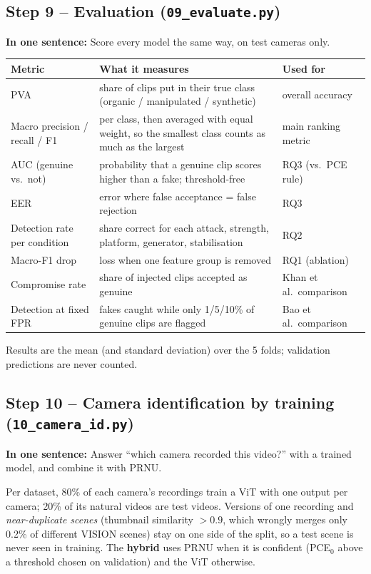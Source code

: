 \documentclass[11pt,a4paper]{article}
\newcommand{\say}[1]{\begin{onesentence}\small\textbf{In one sentence:} #1\end{onesentence}}
\begin{document}
\subsection{Step 9 -- Evaluation (\texttt{09\_evaluate.py})}
\say{Score every model the same way, on test cameras only.}
\begin{table}[H]\centering\small
\begin{tabularx}{\linewidth}{lYl}\toprule
Metric & What it measures & Used for \\\midrule
PVA & share of clips put in their true class (organic / manipulated / synthetic) & overall accuracy \\
Macro precision / recall / F1 & per class, then averaged with equal weight, so the smallest class counts as much as the largest & main ranking metric \\
AUC (genuine vs.\ not) & probability that a genuine clip scores higher than a fake; threshold-free & RQ3 (vs.\ PCE rule) \\
EER & error where false acceptance = false rejection & RQ3 \\
Detection rate per condition & share correct for each attack, strength, platform, generator, stabilisation & RQ2 \\
Macro-F1 drop & loss when one feature group is removed & RQ1 (ablation) \\
Compromise rate & share of injected clips accepted as genuine & Khan et al.\ comparison \\
Detection at fixed FPR & fakes caught while only 1/5/10\% of genuine clips are flagged & Bao et al.\ comparison \\\bottomrule
\end{tabularx}\end{table}
Results are the mean (and standard deviation) over the 5 folds; validation predictions are never counted.

\subsection{Step 10 -- Camera identification by training (\texttt{10\_camera\_id.py})}
\say{Answer ``which camera recorded this video?'' with a trained model, and combine it with PRNU.}
Per dataset, 80\% of each camera's recordings train a ViT with one output per camera; 20\% of its natural videos are test videos.
Versions of one recording and \emph{near-duplicate scenes} (thumbnail similarity $>0.9$, which wrongly merges only 0.2\% of
different VISION scenes) stay on one side of the split, so a test scene is never seen in training. The \textbf{hybrid} uses PRNU
when it is confident (PCE$_0$ above a threshold chosen on validation) and the ViT otherwise.
\end{document}
